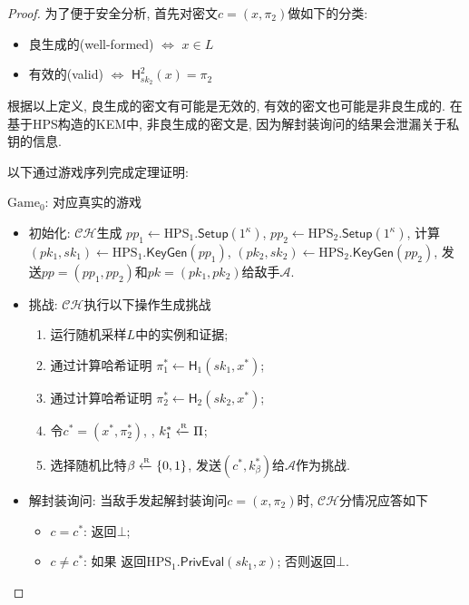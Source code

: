 \begin{proof}
为了便于安全分析, 首先对密文$c = (x, \pi_2)$做如下的分类:
\begin{itemize}
    \item 良生成的(well-formed) $\iff$ $x \in L$
    \item 有效的(valid) $\iff$ $\mathsf{H}_{sk_2}^2(x) = \pi_2$
\end{itemize}
根据以上定义, 良生成的密文有可能是无效的, 有效的密文也可能是非良生成的. 
在基于HPS构造的KEM中, 非良生成的密文是, 因为解封装询问的结果会泄漏关于私钥的信息. 

以下通过游戏序列完成定理证明: 
\begin{trivlist}
\item $\text{Game}_0$: 对应真实的游戏
    \begin{itemize}
        \item 初始化: $\mathcal{CH}$生成
            $pp_1 \leftarrow \text{HPS}_1.\mathsf{Setup}(1^\kappa)$, 
            $pp_2 \leftarrow \text{HPS}_2.\mathsf{Setup}(1^\kappa)$, 
            计算$(pk_1, sk_1) \leftarrow \text{HPS}_1.\mathsf{KeyGen}(pp_1)$, 
            $(pk_2, sk_2) \leftarrow \text{HPS}_2.\mathsf{KeyGen}(pp_2)$, 
            发送$pp = (pp_1, pp_2)$和$pk = (pk_1, pk_2)$给敌手$\mathcal{A}$. 

        \item 挑战: $\mathcal{CH}$执行以下操作生成挑战 
            \begin{enumerate}
                \item 运行随机采样$L$中的实例和证据;  
                \item 通过计算哈希证明
                    $\pi_1^* \leftarrow \mathsf{H}_1(sk_1, x^*)$; 
                \item 通过计算哈希证明
                    $\pi_2^* \leftarrow \mathsf{H}_2(sk_2, x^*)$; 
                \item 令$c^* = (x^*, \pi_2^*)$, , $k_1^* \xleftarrow{\textup{\tiny R}} \Pi$; 
                \item 选择随机比特$\beta \xleftarrow{\textup{\tiny R}} \{0,1\}$, 发送$(c^*, k_\beta^*)$给$\mathcal{A}$作为挑战. 
            \end{enumerate}

        \item 解封装询问: 当敌手发起解封装询问$c = (x, \pi_2)$时, $\mathcal{CH}$分情况应答如下
            \begin{itemize}
                \item $c = c^*$: 返回$\bot$; 
                \item $c \neq c^*$: 如果  
                    返回$\text{HPS}_1.\mathsf{PrivEval}(sk_1, x)$; 否则返回$\bot$. 
            \end{itemize}
    \end{itemize}


\end{trivlist}
\end{proof}
